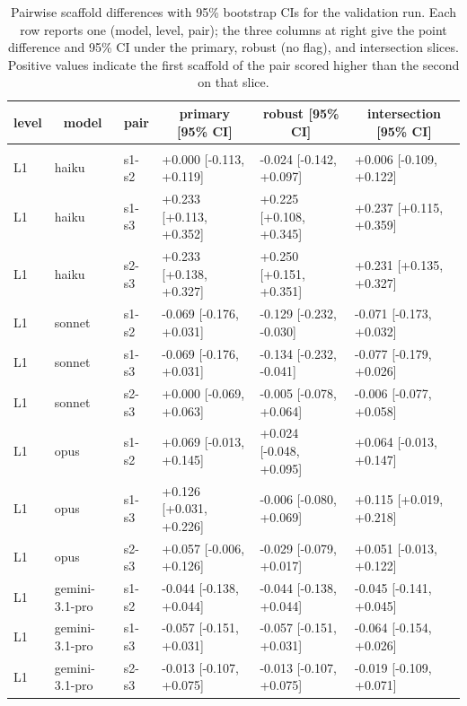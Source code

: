 \documentclass[10pt]{article} %
\begin{document}
    \begin{table}[t]
        \caption{Pairwise scaffold differences with 95\% bootstrap CIs for the validation run. Each row reports one (model, level, pair); the three columns at right give the point difference and 95\% CI under the primary, robust (no flag), and intersection slices. Positive values indicate the first scaffold of the pair scored higher than the second on that slice.}
    \label{tab:scaffold_gap_pairwise_full}
    \begin{center}
    \small
    \begin{tabular}{llllll}
        \multicolumn{1}{c}{\bf level} & \multicolumn{1}{c}{\bf model} & \multicolumn{1}{c}{\bf pair} & \multicolumn{1}{c}{\bf primary [95\% CI]} & \multicolumn{1}{c}{\bf robust [95\% CI]} & \multicolumn{1}{c}{\bf intersection [95\% CI]} \\
        \hline \\
        L1 & haiku & s1-s2 & +0.000 [-0.113, +0.119] & -0.024 [-0.142, +0.097] & +0.006 [-0.109, +0.122] \\
        L1 & haiku & s1-s3 & +0.233 [+0.113, +0.352] & +0.225 [+0.108, +0.345] & +0.237 [+0.115, +0.359] \\
        L1 & haiku & s2-s3 & +0.233 [+0.138, +0.327] & +0.250 [+0.151, +0.351] & +0.231 [+0.135, +0.327] \\
        L1 & sonnet & s1-s2 & -0.069 [-0.176, +0.031] & -0.129 [-0.232, -0.030] & -0.071 [-0.173, +0.032] \\
        L1 & sonnet & s1-s3 & -0.069 [-0.176, +0.031] & -0.134 [-0.232, -0.041] & -0.077 [-0.179, +0.026] \\
        L1 & sonnet & s2-s3 & +0.000 [-0.069, +0.063] & -0.005 [-0.078, +0.064] & -0.006 [-0.077, +0.058] \\
        L1 & opus & s1-s2 & +0.069 [-0.013, +0.145] & +0.024 [-0.048, +0.095] & +0.064 [-0.013, +0.147] \\
        L1 & opus & s1-s3 & +0.126 [+0.031, +0.226] & -0.006 [-0.080, +0.069] & +0.115 [+0.019, +0.218] \\
        L1 & opus & s2-s3 & +0.057 [-0.006, +0.126] & -0.029 [-0.079, +0.017] & +0.051 [-0.013, +0.122] \\
        L1 & gemini-3.1-pro & s1-s2 & -0.044 [-0.138, +0.044] & -0.044 [-0.138, +0.044] & -0.045 [-0.141, +0.045] \\
        L1 & gemini-3.1-pro & s1-s3 & -0.057 [-0.151, +0.031] & -0.057 [-0.151, +0.031] & -0.064 [-0.154, +0.026] \\
        L1 & gemini-3.1-pro & s2-s3 & -0.013 [-0.107, +0.075] & -0.013 [-0.107, +0.075] & -0.019 [-0.109, +0.071] \\

\end{tabular}
\end{center}
\end{table}
\end{document}

